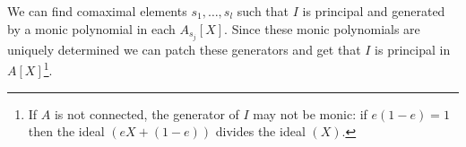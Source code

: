 \begin{corollary}
  We can find comaximal elements $s_1,\dots,s_l$ such that $I$ is principal and generated by a
  monic polynomial in each $A_{s_j}[X]$. Since these monic polynomials are uniquely determined
  we can patch these generators and get that $I$ is principal in $A[X]$\footnote{If $A$ is not
  connected, the generator of $I$ may not be monic: if $e(1-e)=1$ then the ideal $(eX+(1-e))$
  divides the ideal $(X)$.}.
\end{corollary}
